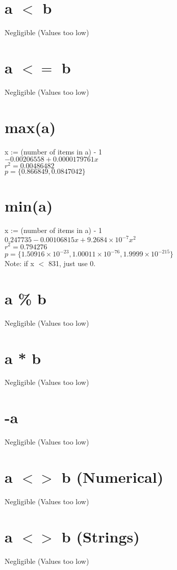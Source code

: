 \documentclass[12pt]{article}
\begin{document}
	\section{a $<$ b}
	Negligible (Values too low)
	
	\section{a $<=$ b}
	Negligible (Values too low)
	
	\section{max(a)} %
	x := (number of items in a) - 1\\
	$-0.00206558 + 0.0000179761 x$\\
	$r^2 = 0.00486482$\\
	$p = \{0.866849, 0.0847042\}$
	
	\section{min(a)}
	x := (number of items in a) - 1\\
	$0.247735 - 0.00106815 x + 9.2684 \times 10^{-7} x^2$\\
	$r^2 = 0.794276$\\
	$p = \{1.50916 \times 10^{-23}, 1.00011 \times 10^{-76}, 1.9999 \times 10^{-215}\}$\\
	Note: if x $<$ 831, just use 0.
	
	\section{a \% b}
	Negligible (Values too low)
	
	\section{a * b}
	Negligible (Values too low)
	
	\section{-a}
	Negligible (Values too low)
	
	\section{a $<>$ b (Numerical)}
	Negligible (Values too low)
	
	\section{a $<>$ b (Strings)}
	Negligible (Values too low)
	
\end{document}
